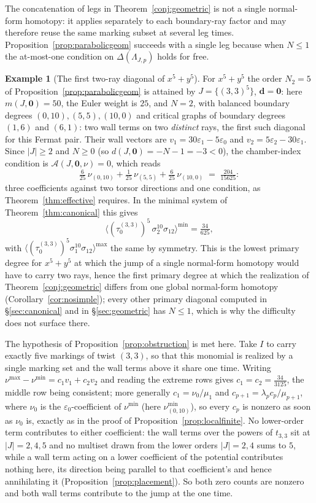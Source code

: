 \documentclass[11pt]{amsart}
\theoremstyle{definition}
\newtheorem{example}[theorem]{Example}
\theoremstyle{remark}
\newcommand{\Ascr}{\mathcal{A}}
\begin{document}
The concatenation of legs in Theorem~\ref{conj:geometric} is not a single
normal-form homotopy: it applies \cite[Lem.~3.40]{GKT} separately
to each boundary-ray factor and may therefore reuse the same marking subset at
several leg times. Proposition~\ref{prop:parabolicgeom} succeeds with a
single leg because when $N\le1$ the at-most-one condition on
$\Delta(\Lambda_{J,p})$ holds for free.

\begin{example}[The first two-ray diagonal of $x^5+y^5$]
\label{ex:tworay}
For $x^{5}+y^{5}$ the order $N_{2}=5$ of
Proposition~\ref{prop:parabolicgeom} is attained by $J=\{(3,3)^{5}\}$,
$\mathbf d=\mathbf 0$: here $m(J,\mathbf 0)=50$, the Euler weight is $25$, and
$N=2$, with balanced boundary degrees $(0,10),(5,5),(10,0)$ and critical graphs of
boundary degrees $(1,6)$ and $(6,1)$: two wall terms on two \emph{distinct} rays,
the first such diagonal for this Fermat pair. Their wall vectors are
$v_{1}=30\varepsilon_{1}-5\varepsilon_{0}$ and $v_{2}=5\varepsilon_{2}-30\varepsilon_{1}$. Since $|J|\ge2$ and $N\ge0$ (so
$d(J,\mathbf 0)=-N-1=-3<0$), the
chamber-index condition is $\Ascr(J,\mathbf 0,\nu)=0$, which reads
\[
\tfrac{6}{25}\,\nu_{(0,10)}+\tfrac1{25}\,\nu_{(5,5)}+\tfrac{6}{25}\,\nu_{(10,0)}
\;=\;\tfrac{204}{15625}:
\]
three coefficients against two torsor directions and one condition, as
Theorem~\ref{thm:effective} requires. In the minimal system of
Theorem~\ref{thm:canonical} this gives
\[
\bigl\langle(\tau_{0}^{(3,3)})^{5}\,\sigma_{2}^{10}\sigma_{12}\bigr\rangle^{\min}
=\tfrac{34}{625},
\]
with $\bigl\langle(\tau_{0}^{(3,3)})^{5}\sigma_{1}^{10}\sigma_{12}\bigr\rangle^{\max}$
the same by symmetry. This is the lowest primary degree
for $x^5+y^5$
at which the jump of a single normal-form homotopy would have to carry two rays,
hence the first primary degree at which the realization of
Theorem~\ref{conj:geometric} differs from one global normal-form homotopy
(Corollary~\ref{cor:nosimple}); every other primary diagonal computed
in \S\ref{sec:canonical} and in \S\ref{sec:geometric} has $N\le1$, which is
why the difficulty does not surface there.

The hypothesis of Proposition~\ref{prop:obstruction} is met here. Take $I$ to carry
exactly five markings of twist $(3,3)$, so that this monomial is realized by a single
marking set and the wall terms above it share one time. Writing
$\nu^{\max}-\nu^{\min}=c_{1}v_{1}+c_{2}v_{2}$ and reading the extreme rows gives
$c_{1}=c_{2}=\tfrac{34}{3125}$, the middle row being consistent; more generally
$c_{1}=\nu_{0}/\mu_{1}$ and $c_{p+1}=\lambda_{p}c_{p}/\mu_{p+1}$, where $\nu_0$ is
the $\varepsilon_0$-coefficient of $\nu^{\min}$ (here $\nu^{\min}_{(0,10)}$), so
every $c_{p}$ is nonzero as soon as $\nu_{0}$ is, exactly as in the proof of
Proposition~\ref{prop:localfinite}.
No lower-order term contributes to either coefficient: the wall terms over the
powers of $t_{3,3}$ sit at
$|J|=2,4,5$ and no multiset drawn from the lower orders $|J|=2,4$ sums to $5$, while a wall term acting on a lower
coefficient of the potential contributes nothing here, its direction being parallel to
that coefficient's and hence annihilating it (Proposition~\ref{prop:placement}). So both
zero counts are nonzero and both wall terms contribute to the jump at the one time.


\end{example}
\end{document}
